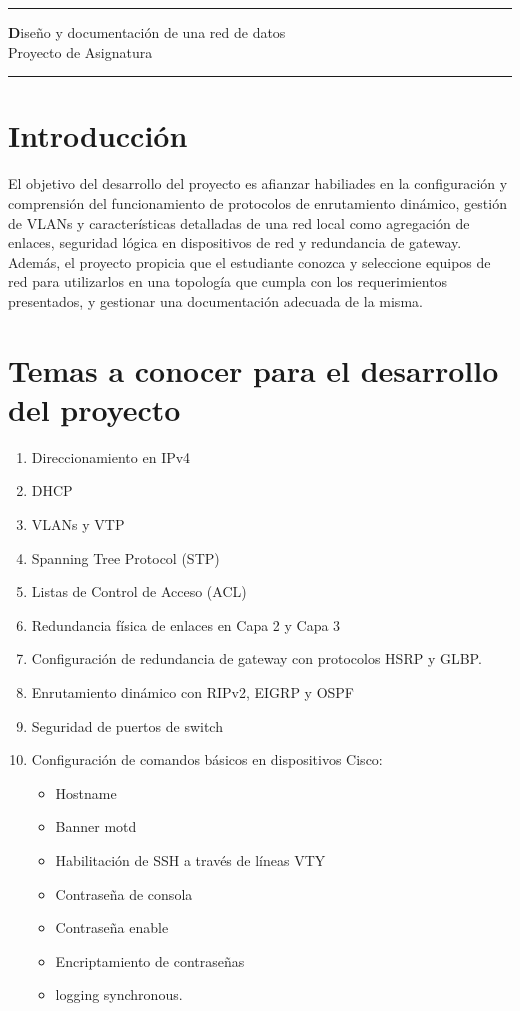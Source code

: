 \documentclass[12pt]{article}
\begin{document}

\begin{center}
\noindent\rule{\textwidth}{1pt}
{\huge\textbf Diseño y documentación de una red de datos}\\
\vspace{10px}
Proyecto de Asignatura
\noindent\rule{\textwidth}{1pt}
\end{center}

\section{Introducción} 
El objetivo del desarrollo del proyecto es afianzar habiliades en la configuración y comprensión del funcionamiento de protocolos de enrutamiento dinámico, gestión de VLANs y características detalladas de una red local como agregación de enlaces, seguridad lógica en dispositivos de red y redundancia de gateway. Además, el proyecto propicia que el estudiante conozca y seleccione equipos de red para utilizarlos en una topología que cumpla con los requerimientos presentados, y gestionar una documentación adecuada de la misma.

\section{Temas a conocer para el desarrollo del proyecto}
\begin{enumerate}
\item Direccionamiento en IPv4
\item DHCP
\item VLANs y VTP
\item Spanning Tree Protocol (STP)
\item Listas de Control de Acceso (ACL)
\item Redundancia física de enlaces en Capa 2 y Capa 3
\item Configuración de redundancia de gateway con protocolos HSRP y GLBP.
\item Enrutamiento dinámico con RIPv2, EIGRP y OSPF
\item Seguridad de puertos de switch
\item Configuración de comandos básicos en dispositivos Cisco:
	\begin{itemize}
    	\item Hostname
    	\item Banner motd
        \item Habilitación de SSH a través de líneas VTY
        \item Contraseña de consola
        \item Contraseña enable
        \item Encriptamiento de contraseñas
        \item logging synchronous.
    \end{itemize}
\end{enumerate}
\end{document}
